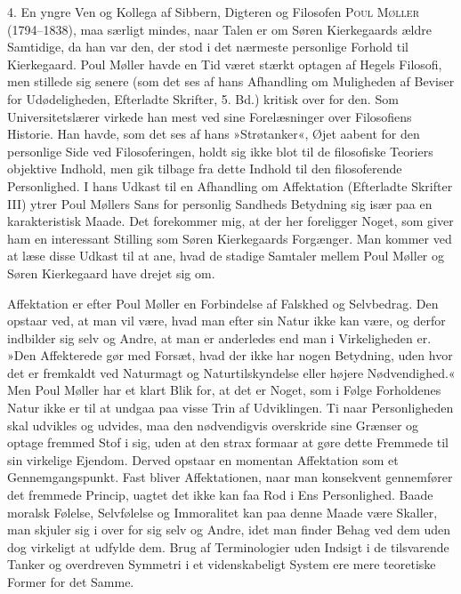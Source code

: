 \documentclass[12pt,a4paper,openany]{book}
\newcommand{\opage}[1]{\marginnote{\footnotesize\textit{[#1]}}}
\begin{document}
4. En yngre Ven og Kollega af Sibbern, Digteren
og Filosofen \textsc{Poul Møller} (1794--1838), maa særligt
mindes, naar Talen er om Søren Kierkegaards ældre
Samtidige, da han var den, der stod i det nærmeste personlige
Forhold til Kierkegaard. Poul Møller havde en
Tid været stærkt optagen af Hegels Filosofi, men stillede
sig senere (som det ses af hans Afhandling om Muligheden
af Beviser for Udødeligheden, Efterladte Skrifter,
5. Bd.) kritisk over for den. Som Universitetslærer
virkede han mest ved sine Forelæsninger over Filosofiens
Historie. Han havde, som det ses af hans »Strøtanker«,
Øjet aabent for den personlige Side ved Filosoferingen,
holdt sig ikke blot til de filosofiske Teoriers objektive
Indhold, men gik tilbage fra dette Indhold til den filosoferende
Personlighed. I hans Udkast til en Afhandling
om Affektation (Efterladte Skrifter III) ytrer Poul Møllers
Sans for personlig Sandheds Betydning sig især paa
en karakteristisk Maade. Det forekommer mig, at der
her foreligger Noget, som giver ham en interessant Stilling
som Søren Kierkegaards Forgænger. Man kommer
ved at læse disse Udkast til at ane, hvad de stadige
Samtaler mellem Poul Møller og Søren Kierkegaard have
drejet sig om.

Affektation er efter Poul Møller en Forbindelse af
Falskhed og Selvbedrag. Den opstaar ved, at man vil
være, hvad man efter sin Natur ikke kan være, og derfor
indbilder sig selv og Andre, at man er anderledes
end man i Virkeligheden er. »Den Affekterede gør med
\opage{25}Forsæt, hvad der ikke har nogen Betydning, uden hvor
det er fremkaldt ved Naturmagt og Naturtilskyndelse
eller højere Nødvendighed.« Men Poul Møller har et
klart Blik for, at det er Noget, som i Følge Forholdenes
Natur ikke er til at undgaa paa visse Trin af Udviklingen.
Ti naar Personligheden skal udvikles og udvides, maa
den nødvendigvis overskride sine Grænser og optage
fremmed Stof i sig, uden at den strax formaar at gøre
dette Fremmede til sin virkelige Ejendom. Derved opstaar
en momentan Affektation som et Gennemgangspunkt.
Fast bliver Affektationen, naar man konsekvent gennemfører
det fremmede Princip, uagtet det ikke kan faa Rod
i Ens Personlighed. Baade moralsk Følelse, Selvfølelse
og Immoralitet kan paa denne Maade være Skaller, man
skjuler sig i over for sig selv og Andre, idet man finder
Behag ved dem uden dog virkeligt at udfylde dem. Brug
af Terminologier uden Indsigt i de tilsvarende Tanker
og overdreven Symmetri i et videnskabeligt System ere
mere teoretiske Former for det Samme.
\end{document}
